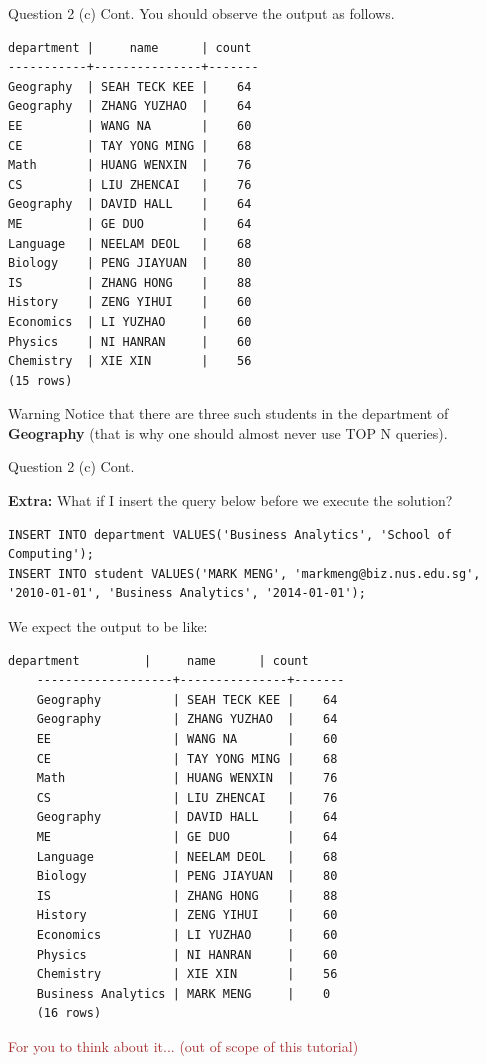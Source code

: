 \begin{frame}[fragile]{Question 2 (c) Cont.}
You should observe the output as follows.\\
\begin{lstlisting}[style=terminial-tiny]	
department |     name      | count
-----------+---------------+-------
Geography  | SEAH TECK KEE |    64
Geography  | ZHANG YUZHAO  |    64
EE         | WANG NA       |    60
CE         | TAY YONG MING |    68
Math       | HUANG WENXIN  |    76
CS         | LIU ZHENCAI   |    76
Geography  | DAVID HALL    |    64
ME         | GE DUO        |    64
Language   | NEELAM DEOL   |    68
Biology    | PENG JIAYUAN  |    80
IS         | ZHANG HONG    |    88
History    | ZENG YIHUI    |    60
Economics  | LI YUZHAO     |    60
Physics    | NI HANRAN     |    60
Chemistry  | XIE XIN       |    56
(15 rows)
\end{lstlisting}\vspace{5pt}
\begin{alertblock}{Warning}
	Notice that there are three such students in the department of \textbf{Geography}  (that is why one should almost never use TOP N queries). 	
\end{alertblock}
\end{frame}

\begin{frame}[fragile]{Question 2 (c) Cont.}
	
	
\textbf{Extra:} What if I insert the query below before we execute the solution?
\begin{lstlisting}
INSERT INTO department VALUES('Business Analytics', 'School of Computing');
INSERT INTO student VALUES('MARK MENG', 'markmeng@biz.nus.edu.sg', '2010-01-01', 'Business Analytics', '2014-01-01');
\end{lstlisting}
We expect the output to be like:\\
\begin{lstlisting}[style=terminial-tiny]	
	department         |     name      | count
	-------------------+---------------+-------
	Geography          | SEAH TECK KEE |    64
	Geography          | ZHANG YUZHAO  |    64
	EE                 | WANG NA       |    60
	CE                 | TAY YONG MING |    68
	Math               | HUANG WENXIN  |    76
	CS                 | LIU ZHENCAI   |    76
	Geography          | DAVID HALL    |    64
	ME                 | GE DUO        |    64
	Language           | NEELAM DEOL   |    68
	Biology            | PENG JIAYUAN  |    80
	IS                 | ZHANG HONG    |    88
	History            | ZENG YIHUI    |    60
	Economics          | LI YUZHAO     |    60
	Physics            | NI HANRAN     |    60
	Chemistry          | XIE XIN       |    56
	Business Analytics | MARK MENG     |    0
	(16 rows)
\end{lstlisting}
	\textcolor{brown}{For you to think about it... (out of scope of this tutorial)}
\end{frame}

